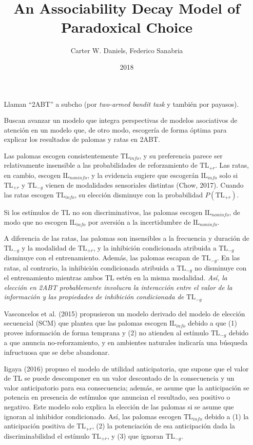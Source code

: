 \documentclass[a4paper,12pt]{article}
\title{An Associability Decay Model of Paradoxical Choice}
\author{Carter W. Daniels, Federico Sanabria}
\date{2018}
\begin{document}
{\scshape\bfseries \maketitle}

Llaman ``2ABT'' a subcho (por {\itshape two-armed bandit task} y también por payasos).

Buscan avanzar un modelo que integra perspectivas de modelos asociativos de atención en un modelo que, de otro modo, escogería de forma óptima para explicar los resultados de palomas y ratas en 2ABT.

Las palomas escogen consistentemente $\mbox{TL}_{info}$, y su preferencia parece ser relativamente insensible a las probabilidades de reforzamiento de $\mbox{TL}_{+r}$. Las ratas, en cambio, escogen $\mbox{IL}_{noninfo}$, y la evidencia sugiere que escogerán $\mbox{IL}_{info}$ solo si $\mbox{TL}_{+r}$ y $\mbox{TL}_{-g}$ vienen de modalidades sensoriales distintas (Chow, 2017). Cuando las ratas escogen $\mbox{TL}_{info}$, su elección disminuye con la probabilidad $P(\mbox{TL}_{+r})$.

Si los estímulos de TL no son discriminativos, las palomas escogen $\mbox{IL}_{noninfo}$, de modo que no escogen $\mbox{IL}_{info}$ por aversión a la incertidumbre de $\mbox{IL}_{noninfo}$.

A diferencia de las ratas, las palomas son insensibles a la frecuencia y duración de $\mbox{TL}_{-g}$ y la modalidad de $\mbox{TL}_{+r}$, y la inhibición condicionada atribuida a $\mbox{TL}_{-g}$ disminuye con el entrenamiento. Además, las palomas escapan de $\mbox{TL}_{-g}$. En las ratas, al contrario, la inhibición condicionada atribuida a $\mbox{TL}_{-g}$ no disminuye con el entrenamiento mientras ambos TL estén en la misma modalidad. {\itshape Así, la elección en 2ABT probablemente involucra la interacción entre el valor de la información y las propiedades de inhibición condicionada de $\mbox{TL}_{-g}$}

Vasconcelos et al. (2015) propusieron un modelo derivado del modelo de elección secuencial (SCM) que plantea que las palomas escogen $\mbox{IL}_{info}$ debido a que (1) provee información de forma temprana y (2) no atienden al estímulo $\mbox{TL}_{-g}$ debido a que anuncia no-reforzamiento, y en ambientes naturales indicaría una búsqueda infructuosa que se debe abandonar.

Iigaya (2016) propuso el modelo de utilidad anticipatoria, que supone que el valor de TL se puede descomponer en un valor descontado de la consecuencia y un valor anticipatorio para esa consecuencia; además, se asume que la anticipación se potencia en presencia de estímulos que anuncian el resultado, sea positivo o negativo. Este modelo solo explica la elección de las palomas si se asume que ignoran al inhibidor condicionado. Así, las palomas escogen $\mbox{TL}_{info}$ debido a (1) la anticipación positiva de TL$_{+r}$, (2) la potenciación de esa anticipación dada la discriminabilidad el estímulo TL$_{+r}$, y (3) que ignoran TL$_{-g}$.
\end{document}
